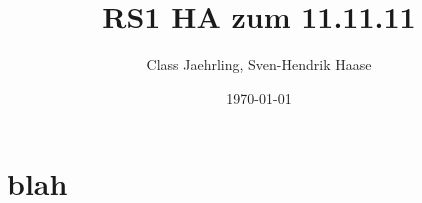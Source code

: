 \documentclass[12pt]{article}
\author{Class Jaehrling, Sven-Hendrik Haase}
\title{RS1 HA zum 11.11.11}
\date{\today}
\begin{document}
\maketitle

\section{blah}
\end{document}
